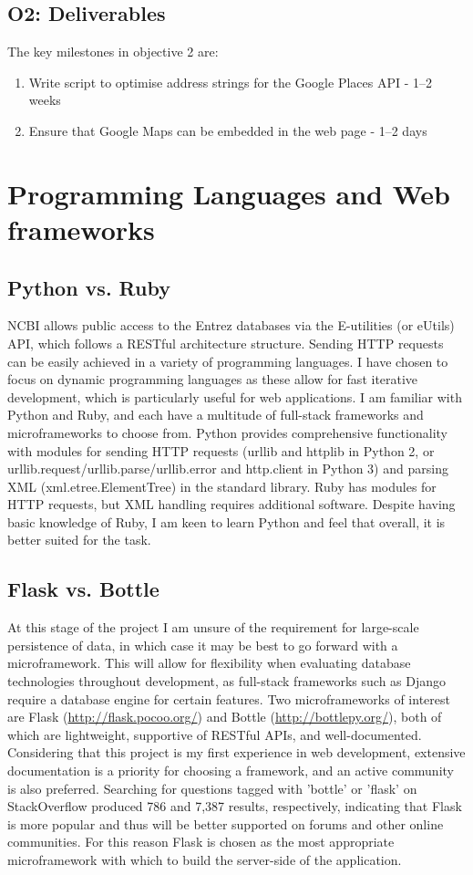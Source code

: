 \documentclass[PROP_AGutteridge_CS.tex]{subfiles}
\begin{document}
\subsection{O2: Deliverables}
The key milestones in objective 2 are:
\begin{enumerate}
\item{Write script to optimise address strings for the Google Places API - 1--2 weeks}
\item{Ensure that Google Maps can be embedded in the web page - 1--2 days}
\end{enumerate}

\section{Programming Languages and Web frameworks}
\subsection{Python vs. Ruby}
NCBI allows public access to the Entrez databases via the E-utilities (or eUtils) API, which follows a RESTful architecture structure. Sending HTTP requests can be easily achieved in a variety of programming languages. I have chosen to focus on dynamic programming languages as these allow for fast iterative development, which is particularly useful for web applications. I am familiar with Python and Ruby, and each have a multitude of full-stack frameworks and microframeworks to choose from. Python provides comprehensive functionality with modules for sending HTTP requests (urllib and httplib in Python 2, or urllib.request/urllib.parse/urllib.error and http.client in Python 3) and parsing XML (xml.etree.ElementTree) in the standard library. Ruby has modules for HTTP requests, but XML handling requires additional software. Despite having basic knowledge of Ruby, I am keen to learn Python and feel that overall, it is better suited for the task.

\subsection{Flask vs. Bottle}
At this stage of the project I am unsure of the requirement for large-scale persistence of data, in which case it may be best to go forward with a microframework. This will allow for flexibility when evaluating database technologies throughout development, as full-stack frameworks such as Django require a database engine for certain features. Two microframeworks of interest are Flask (\url{http://flask.pocoo.org/}) and Bottle (\url{http://bottlepy.org/}), both of which are lightweight, supportive of RESTful APIs, and well-documented. Considering that this project is my first experience in web development, extensive documentation is a priority for choosing a framework, and an active community is also preferred. Searching for questions tagged with 'bottle' or 'flask' on StackOverflow produced 786 and 7,387 results, respectively, indicating that Flask is more popular and thus will be better supported on forums and other online communities. For this reason Flask is chosen as the most appropriate microframework with which to build the server-side of the application.
\end{document}
